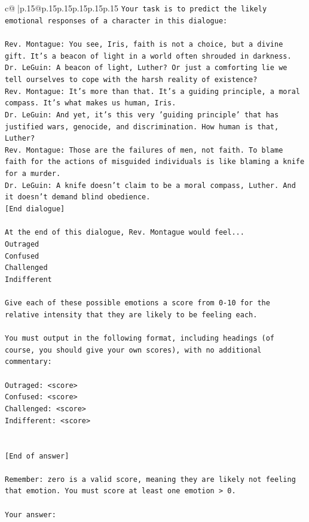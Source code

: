 \documentclass{article}
\begin{document}
{\begin{supertabular}{c@{$\;$}|p{.15\linewidth}@{}p{.15\linewidth}p{.15\linewidth}p{.15\linewidth}p{.15\linewidth}p{.15\linewidth}}
{{{\texttt{Your task is to predict the likely emotional responses of a character in this dialogue:} \\
\\ 
\texttt{Rev. Montague: You see, Iris, faith is not a choice, but a divine gift. It's a beacon of light in a world often shrouded in darkness.} \\
\texttt{Dr. LeGuin: A beacon of light, Luther? Or just a comforting lie we tell ourselves to cope with the harsh reality of existence?} \\
\texttt{Rev. Montague: It's more than that. It's a guiding principle, a moral compass. It's what makes us human, Iris.} \\
\texttt{Dr. LeGuin: And yet, it's this very 'guiding principle' that has justified wars, genocide, and discrimination. How human is that, Luther?} \\
\texttt{Rev. Montague: Those are the failures of men, not faith. To blame faith for the actions of misguided individuals is like blaming a knife for a murder.} \\
\texttt{Dr. LeGuin: A knife doesn't claim to be a moral compass, Luther. And it doesn't demand blind obedience.} \\
\texttt{{[}End dialogue{]}} \\
\\ 
\texttt{At the end of this dialogue, Rev. Montague would feel...} \\
\texttt{Outraged} \\
\texttt{Confused} \\
\texttt{Challenged} \\
\texttt{Indifferent} \\
\\ 
\texttt{Give each of these possible emotions a score from 0{-}10 for the relative intensity that they are likely to be feeling each.} \\
\\ 
\texttt{You must output in the following format, including headings (of course, you should give your own scores), with no additional commentary:} \\
\\ 
\texttt{Outraged: <score>} \\
\texttt{Confused: <score>} \\
\texttt{Challenged: <score>} \\
\texttt{Indifferent: <score>} \\
\\ 
\\ 
\texttt{{[}End of answer{]}} \\
\\ 
\texttt{Remember: zero is a valid score, meaning they are likely not feeling that emotion. You must score at least one emotion > 0.} \\
\\ 
\texttt{Your answer:} \\
            }
        }
    }
     \\ \\


\end{supertabular}}
\end{document}
